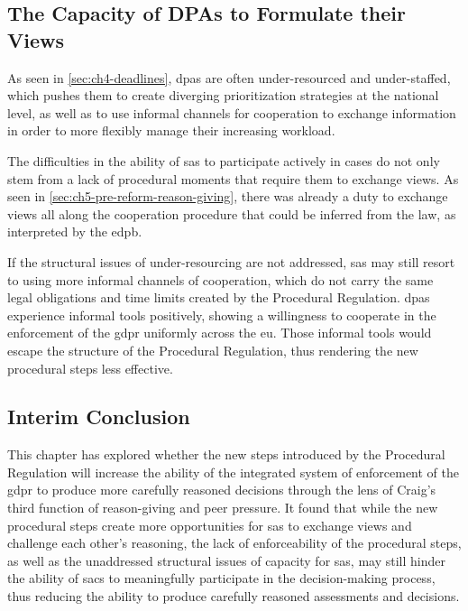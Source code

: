 \subsection{The Capacity of DPAs to Formulate their Views}
\label{sec:ch5-capacity}

As seen in \cref{sec:ch4-deadlines}, \glspl{dpa} are often under-resourced and under-staffed,\autocite[4.4]{edpbContributionGDPREvaluation2023} which pushes them to create diverging prioritization strategies at the national level,\autocite[501]{mustertProceduralisingEnforcement2026} as well as to use informal channels for cooperation to exchange information in order to more flexibly manage their increasing workload.\autocites[466--467]{hofmannmustertScholtenHandbook2023}[4.1.2]{edpbContributionGDPREvaluation2023}

The difficulties in the ability of \glspl{sa} to participate actively in cases do not only stem from a lack of procedural moments that require them to exchange views.
As seen in \cref{sec:ch5-pre-reform-reason-giving}, there was already a duty to exchange views all along the cooperation procedure that could be inferred from the law, as interpreted by the \gls{edpb}.

If the structural issues of under-resourcing are not addressed, \glspl{sa} may still resort to using more informal channels of cooperation, which do not carry the same legal obligations and time limits created by the Procedural Regulation.\autocite[467]{hofmannmustertScholtenHandbook2023}
\glspl{dpa} experience informal tools positively, showing a willingness to cooperate in the enforcement of the \gls{gdpr} uniformly across the \gls{eu}.\autocite[4.1.2]{edpbContributionGDPREvaluation2023}
Those informal tools would escape the structure of the Procedural Regulation, thus rendering the new procedural steps less effective.

\subsection{Interim Conclusion}
\label{sec:ch5-interim-conclusion}

This chapter has explored whether the new steps introduced by the Procedural Regulation will increase the ability of the integrated system of enforcement of the \gls{gdpr} to produce more carefully reasoned decisions through the lens of Craig's third function of reason-giving and peer pressure.
It found that while the new procedural steps create more opportunities for \glspl{sa} to exchange views and challenge each other's reasoning, the lack of enforceability of the procedural steps, as well as the unaddressed structural issues of capacity for \glspl{sa}, may still hinder the ability of \glspl{sac} to meaningfully participate in the decision-making process, thus reducing the ability to produce carefully reasoned assessments and decisions.